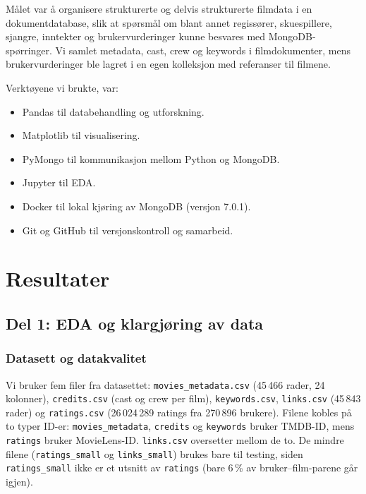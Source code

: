 \documentclass[11pt,a4paper]{article}
\begin{document}
Målet var å organisere strukturerte og delvis strukturerte filmdata i en dokumentdatabase, slik at spørsmål om blant annet regissører, skuespillere, sjangre, inntekter og brukervurderinger kunne besvares med MongoDB-spørringer. Vi samlet metadata, cast, crew og keywords i filmdokumenter, mens brukervurderinger ble lagret i en egen kolleksjon med referanser til filmene.

Verktøyene vi brukte, var:
\begin{itemize}
  \item Pandas til databehandling og utforskning.
  \item Matplotlib til visualisering.
  \item PyMongo til kommunikasjon mellom Python og MongoDB.
  \item Jupyter til EDA.
  \item Docker til lokal kjøring av MongoDB (versjon 7.0.1).
  \item Git og GitHub til versjonskontroll og samarbeid.
\end{itemize}

\section{Resultater}

\subsection{Del 1: EDA og klargjøring av data}
\FloatBarrier
\subsubsection{Datasett og datakvalitet}
\begin{sloppypar}
Vi bruker fem filer fra datasettet: \texttt{movies\_metadata.csv} (45\,466 rader, 24 kolonner), \texttt{credits.csv} (cast og crew per film), \texttt{keywords.csv}, \texttt{links.csv} (45\,843 rader) og \texttt{ratings.csv} (26\,024\,289 ratings fra 270\,896 brukere). Filene kobles på to typer ID-er: \texttt{movies\_metadata}, \texttt{credits} og \texttt{keywords} bruker TMDB-ID, mens \texttt{ratings} bruker MovieLens-ID. \texttt{links.csv} oversetter mellom de to. De mindre filene (\texttt{ratings\_small} og \texttt{links\_small}) brukes bare til testing, siden \texttt{ratings\_small} ikke er et utsnitt av \texttt{ratings} (bare 6\,\% av bruker--film-parene går igjen).
\end{sloppypar}
\end{document}
